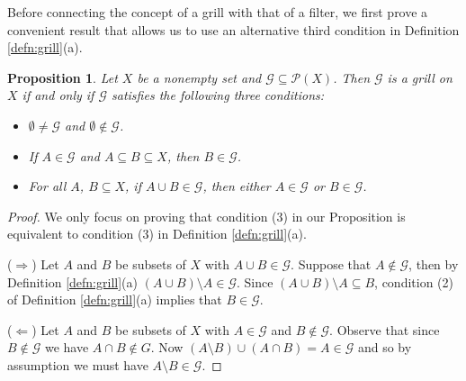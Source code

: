 \documentclass[12pt]{article}
\theoremstyle{plain}
\newtheorem{prop}[thm]{Proposition}
\theoremstyle{definition}
\newcommand{\calG}{\mathcal{G}}
\newcommand{\calP}{\mathcal{P}}
\begin{document}
Before connecting the concept of a grill with that of a filter, we first prove a convenient result that allows us to use an alternative third condition in Definition \ref{defn:grill}(a).

\begin{prop}
  \label{prop:alt3}
  Let $X$ be a nonempty set and $\calG \subseteq \calP(X)$.
  Then $\calG$ is a grill on $X$ if and only if $\calG$ satisfies the following three conditions:
  \begin{itemize}
    \item[(1)] $\emptyset \ne \calG$ and $\emptyset \not\in \calG$.

    \item[(2)] If $A \in \calG$ and $A \subseteq B \subseteq X$, then $B \in \calG$.

    \item[(3)] For all $A$, $B \subseteq X$, if $A \cup B \in \calG$, then either $A \in \calG$ or $B \in \calG$. 
  \end{itemize}
\end{prop}
\begin{proof}
  We only focus on proving that condition (3) in our Proposition is equivalent to condition (3) in Definition \ref{defn:grill}(a).

  ($\Rightarrow$)
  Let $A$ and $B$ be subsets of $X$ with $A \cup B \in \calG$.
  Suppose that $A \not\in \calG$, then by Definition \ref{defn:grill}(a) $(A \cup B) \setminus A \in \calG$.
  Since $(A \cup B) \setminus A \subseteq B$, condition (2) of Definition \ref{defn:grill}(a) implies that $B \in \calG$.

  ($\Leftarrow$)
  Let $A$ and $B$ be subsets of $X$ with $A \in \calG$ and $B \not\in \calG$.
  Observe that since $B \not\in \calG$ we have $A \cap B \not\in G$.
  Now $(A \setminus B) \cup (A \cap B) = A \in \calG$ and so by assumption we must have $A \setminus B \in \calG$.
\end{proof}
\end{document}
